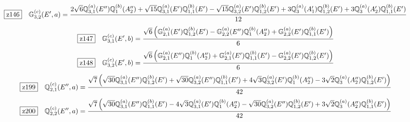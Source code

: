 \documentclass[fleqn,10pt,landscape]{jsarticle}
\begin{document}
\begin{dmath*}
\hspace*{3mm}\fbox{z146}\quad \mathbb{G}_{3,2}^{(c)}(E^{\prime},a)=\frac{2 \sqrt{6} \mathbb{Q}_{3,1}^{(a)}(E^{\prime\prime}) \mathbb{Q}_{1}^{(b)}(A_{2}^{\prime\prime}) + \sqrt{15} \mathbb{Q}_{3,1}^{(a)}(E^{\prime}) \mathbb{Q}_{1,1}^{(b)}(E^{\prime}) - \sqrt{15} \mathbb{Q}_{3,2}^{(a)}(E^{\prime}) \mathbb{Q}_{1,2}^{(b)}(E^{\prime}) + 3 \mathbb{Q}_{3}^{(a)}(A_{1}^{\prime}) \mathbb{Q}_{1,2}^{(b)}(E^{\prime}) + 3 \mathbb{Q}_{3}^{(a)}(A_{2}^{\prime}) \mathbb{Q}_{1,1}^{(b)}(E^{\prime})}{12}
\end{dmath*}
\begin{dmath*}
\hspace*{3mm}\fbox{z147}\quad \mathbb{G}_{3,1}^{(c)}(E^{\prime},b)=\frac{\sqrt{6} \left(\mathbb{G}_{2,1}^{(a)}(E^{\prime}) \mathbb{Q}_{1,2}^{(b)}(E^{\prime}) - \mathbb{G}_{2,2}^{(a)}(E^{\prime\prime}) \mathbb{Q}_{1}^{(b)}(A_{2}^{\prime\prime}) + \mathbb{G}_{2,2}^{(a)}(E^{\prime}) \mathbb{Q}_{1,1}^{(b)}(E^{\prime})\right)}{6}
\end{dmath*}
\begin{dmath*}
\hspace*{3mm}\fbox{z148}\quad \mathbb{G}_{3,2}^{(c)}(E^{\prime},b)=\frac{\sqrt{6} \left(\mathbb{G}_{2,1}^{(a)}(E^{\prime\prime}) \mathbb{Q}_{1}^{(b)}(A_{2}^{\prime\prime}) + \mathbb{G}_{2,1}^{(a)}(E^{\prime}) \mathbb{Q}_{1,1}^{(b)}(E^{\prime}) - \mathbb{G}_{2,2}^{(a)}(E^{\prime}) \mathbb{Q}_{1,2}^{(b)}(E^{\prime})\right)}{6}
\end{dmath*}
\begin{dmath*}
\hspace*{3mm}\fbox{z199}\quad \mathbb{Q}_{2,1}^{(c)}(E^{\prime\prime},a)=\frac{\sqrt{7} \left(\sqrt{30} \mathbb{Q}_{3,1}^{(a)}(E^{\prime\prime}) \mathbb{Q}_{1,2}^{(b)}(E^{\prime}) + \sqrt{30} \mathbb{Q}_{3,2}^{(a)}(E^{\prime\prime}) \mathbb{Q}_{1,1}^{(b)}(E^{\prime}) + 4 \sqrt{3} \mathbb{Q}_{3,2}^{(a)}(E^{\prime}) \mathbb{Q}_{1}^{(b)}(A_{2}^{\prime\prime}) - 3 \sqrt{2} \mathbb{Q}_{3}^{(a)}(A_{2}^{\prime\prime}) \mathbb{Q}_{1,2}^{(b)}(E^{\prime})\right)}{42}
\end{dmath*}
\begin{dmath*}
\hspace*{3mm}\fbox{z200}\quad \mathbb{Q}_{2,2}^{(c)}(E^{\prime\prime},a)=\frac{\sqrt{7} \left(\sqrt{30} \mathbb{Q}_{3,1}^{(a)}(E^{\prime\prime}) \mathbb{Q}_{1,1}^{(b)}(E^{\prime}) - 4 \sqrt{3} \mathbb{Q}_{3,1}^{(a)}(E^{\prime}) \mathbb{Q}_{1}^{(b)}(A_{2}^{\prime\prime}) - \sqrt{30} \mathbb{Q}_{3,2}^{(a)}(E^{\prime\prime}) \mathbb{Q}_{1,2}^{(b)}(E^{\prime}) + 3 \sqrt{2} \mathbb{Q}_{3}^{(a)}(A_{2}^{\prime\prime}) \mathbb{Q}_{1,1}^{(b)}(E^{\prime})\right)}{42}
\end{dmath*}
\end{document}
